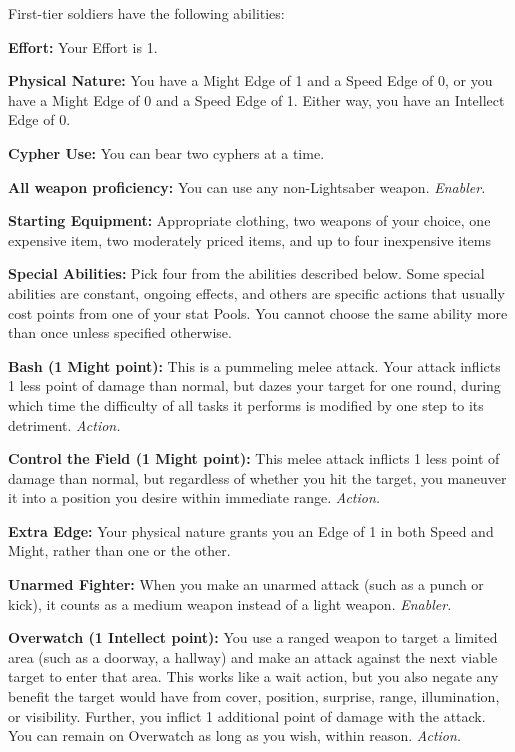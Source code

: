 \documentclass[a4paper,10pt,final,twocolumn,oneside]{book}
\newcommand{\itemLine}[2]{\textbf{#1:}{ #2}\par}
\newcommand{\itemAbility}[2]{\textcolor{25gray}{\textbullet\textbf{ #1:}}{ #2}\par}
\newcommand{\enabler}{\textit{ Enabler.}}
\newcommand{\action}{\textit{ Action.}}
\begin{document}
First-tier soldiers have the following abilities:

\itemLine{Effort}{Your Effort is 1.}

\itemLine{Physical Nature}{You have a Might Edge
of 1 and a Speed Edge of 0, or you have a
Might Edge of 0 and a Speed Edge of 1.
Either way, you have an Intellect Edge of 0.}

\itemLine{Cypher Use}{You can bear two cyphers at a time.}

\itemLine{All weapon proficiency}{You can use any non-Lightsaber weapon.\enabler}

\itemLine{Starting Equipment}{Appropriate clothing, two weapons of your choice, one expensive item, two moderately priced items, and up to four inexpensive items}

\itemLine{Special Abilities}{Pick four from the abilities described below. Some special abilities are constant, ongoing effects, and others are specific actions that usually cost points from one of your stat Pools. You cannot choose the same ability more than once unless specified otherwise.}

\itemAbility{Bash (1 Might point)}{This is a pummeling melee attack. Your attack inflicts 1 less point of damage than normal, but dazes your target for one round, during which time the difficulty of all tasks it performs is modified by one step to its detriment.\action}

\itemAbility{Control the Field (1 Might point)}{This melee attack inflicts 1 less point of damage than normal, but regardless of whether you hit the target, you maneuver it into a position you desire within immediate range.\action}

\itemAbility{Extra Edge}{Your physical nature grants you an Edge of 1 in both Speed and Might, rather than one or the other.}

\itemAbility{Unarmed Fighter}{When you make an unarmed attack (such as a punch or kick), it counts as a medium weapon instead of a light weapon.\enabler}

\itemAbility{Overwatch (1 Intellect point)}{You use a ranged weapon to target a limited area (such as a doorway, a hallway) and make an attack against the next viable target to enter that area. This works like a wait action, but you also negate any benefit the target would have from cover, position, surprise, range, illumination, or visibility. Further, you inflict 1 additional point of damage with the attack. You can remain on Overwatch as long as you wish, within reason.\action}
\end{document}
